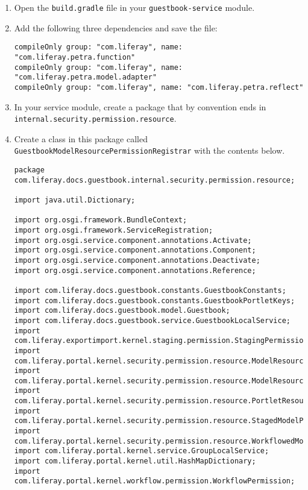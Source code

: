 \begin{enumerate}
\def\labelenumi{\arabic{enumi}.}
\item
  Open the \texttt{build.gradle} file in your \texttt{guestbook-service}
  module.
\item
  Add the following three dependencies and save the file:

\begin{verbatim}
compileOnly group: "com.liferay", name: "com.liferay.petra.function"
compileOnly group: "com.liferay", name: "com.liferay.petra.model.adapter"
compileOnly group: "com.liferay", name: "com.liferay.petra.reflect"
\end{verbatim}
\item
  In your service module, create a package that by convention ends in
  \texttt{internal.security.permission.resource}.
\item
  Create a class in this package called
  \texttt{GuestbookModelResourcePermissionRegistrar} with the contents
  below.

\begin{verbatim}
package com.liferay.docs.guestbook.internal.security.permission.resource;

import java.util.Dictionary;

import org.osgi.framework.BundleContext;
import org.osgi.framework.ServiceRegistration;
import org.osgi.service.component.annotations.Activate;
import org.osgi.service.component.annotations.Component;
import org.osgi.service.component.annotations.Deactivate;
import org.osgi.service.component.annotations.Reference;

import com.liferay.docs.guestbook.constants.GuestbookConstants;
import com.liferay.docs.guestbook.constants.GuestbookPortletKeys;
import com.liferay.docs.guestbook.model.Guestbook;
import com.liferay.docs.guestbook.service.GuestbookLocalService;
import com.liferay.exportimport.kernel.staging.permission.StagingPermission;
import com.liferay.portal.kernel.security.permission.resource.ModelResourcePermission;
import com.liferay.portal.kernel.security.permission.resource.ModelResourcePermissionFactory;
import com.liferay.portal.kernel.security.permission.resource.PortletResourcePermission;
import com.liferay.portal.kernel.security.permission.resource.StagedModelPermissionLogic;
import com.liferay.portal.kernel.security.permission.resource.WorkflowedModelPermissionLogic;
import com.liferay.portal.kernel.service.GroupLocalService;
import com.liferay.portal.kernel.util.HashMapDictionary;
import com.liferay.portal.kernel.workflow.permission.WorkflowPermission;


\end{verbatim}
\end{enumerate}
